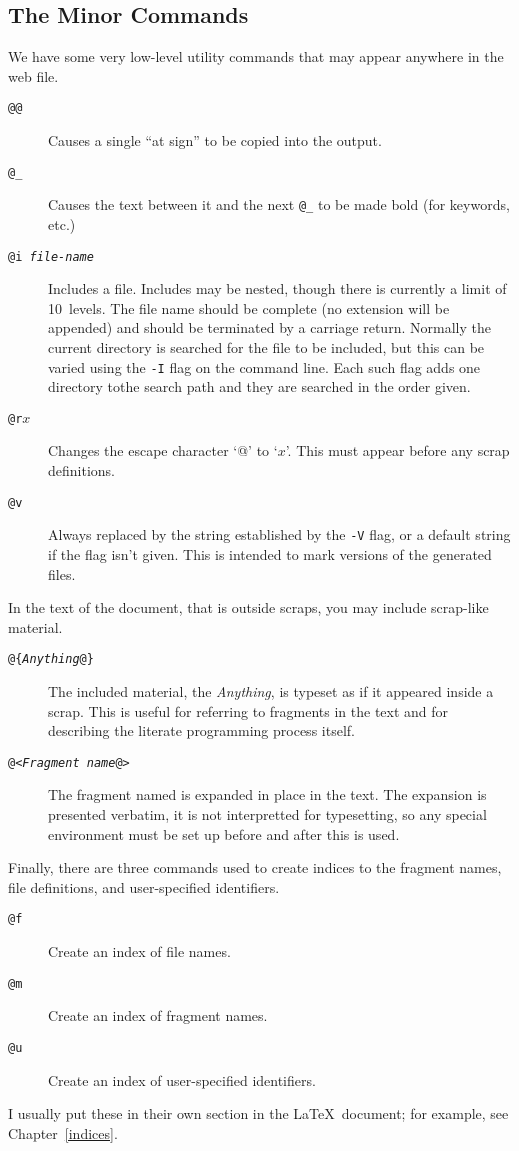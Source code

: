 \documentclass[a4paper]{report}
\begin{document}
\subsection{The Minor Commands\label{minorcommands}}

We have some very low-level utility commands that may appear anywhere
in the web file.
\begin{description}
\item[\tt @@] Causes a single ``at sign'' to be copied into the output.
\item[\tt @\_] Causes the text between it and the next {\tt @\_}
      to be made bold (for keywords, etc.)
\item[\tt @i {\em file-name\/}] Includes a file. Includes may be
  nested, though there is currently a limit of 10~levels. The file name
  should be complete (no extension will be appended) and should be
  terminated by a carriage return. Normally the current directory is
  searched for the file to be included, but this can be varied using
  the \verb|-I| flag on the command line. Each such flag adds one
  directory tothe search path and they are searched in the order
  given.
\item[{\tt @r}$x$] Changes the escape character `@' to `$x$'.
  This must appear before any scrap definitions.
\item[\tt @v] Always replaced by the string established by
the \texttt{-V} flag, or a default string if the flag isn't
given. This is intended to mark versions of the generated
files.
\end{description}

In the text of the document, that is outside scraps, you may include
scrap-like material.

\begin{description}
\item[\tt @\{\textit{Anything}@\}]
The included material, the \textit{Anything},
is typeset as if it appeared inside a scrap. This is useful for
referring to fragments in the text and for
describing the literate programming process itself.
\item[\tt @<\textit{Fragment name}@>]
The fragment named is expanded in place in the text. 
The expansion is presented verbatim, it is not interpretted for
typesetting, so any special environment must be set up before and
after this is used.
\end{description}

Finally, there are three commands used to create indices to the
fragment
names, file definitions, and user-specified identifiers.
\begin{description}
\item[\tt @f] Create an index of file names.
\item[\tt @m] Create an index of fragment names.
\item[\tt @u] Create an index of user-specified identifiers.
\end{description}
I usually put these in their own section
in the \LaTeX\ document; for example, see Chapter~\ref{indices}.
\end{document}
